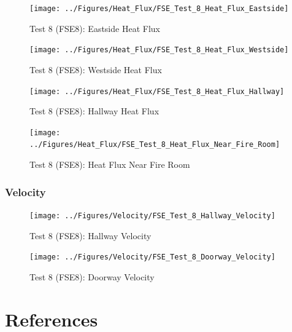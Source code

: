 \documentclass[12pt,oneside]{book}
\begin{document}
\begin{figure}[!ht]
	\texttt{[image: ../Figures/Heat\_Flux/FSE\_Test\_8\_Heat\_Flux\_Eastside]}
	\caption{Test 8 (FSE8): Eastside Heat Flux}
	\label{fig:Test_8_Eastside_Heat_Flux}
\end{figure}

\begin{figure}[!ht]
	\texttt{[image: ../Figures/Heat\_Flux/FSE\_Test\_8\_Heat\_Flux\_Westside]}
	\caption{Test 8 (FSE8): Westside Heat Flux}
	\label{fig:Test_8_Westside_Heat_Flux}
\end{figure}

\begin{figure}[!ht]
	\texttt{[image: ../Figures/Heat\_Flux/FSE\_Test\_8\_Heat\_Flux\_Hallway]}
	\caption{Test 8 (FSE8): Hallway Heat Flux}
	\label{fig:Test_8_Hallway_Heat_Flux}
\end{figure}

\begin{figure}[!ht]
	\texttt{[image: ../Figures/Heat\_Flux/FSE\_Test\_8\_Heat\_Flux\_Near\_Fire\_Room]}
	\caption{Test 8 (FSE8): Heat Flux Near Fire Room}
	\label{fig:Test_8_Heat_Flux_Near_Fire_Room}
\end{figure}

\subsection{Velocity}
\label{subsec:Velocity}

\begin{figure}[!ht]
	\texttt{[image: ../Figures/Velocity/FSE\_Test\_8\_Hallway\_Velocity]}
	\caption{Test 8 (FSE8): Hallway Velocity}
	\label{fig:Test_8_Hallway_Velocity}
\end{figure}

\begin{figure}[!ht]
	\texttt{[image: ../Figures/Velocity/FSE\_Test\_8\_Doorway\_Velocity]}
	\caption{Test 8 (FSE8): Doorway Velocity}
	\label{fig:Test_8_Doorway_Velocity}
\end{figure}

\clearpage

\chapter{References}
\label{chap:References}



	
\end{document}
